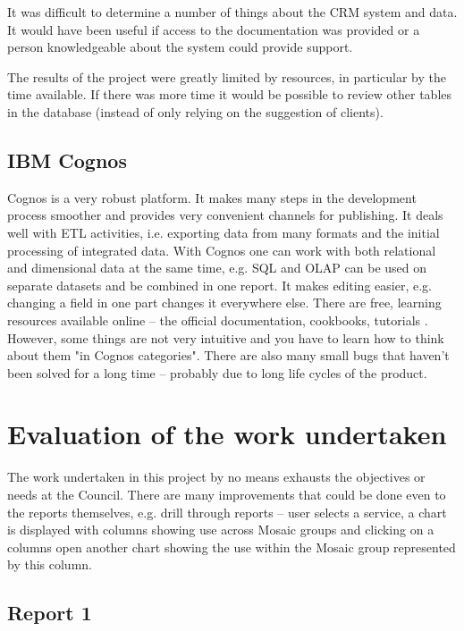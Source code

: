 It was difficult to determine a number of things about the CRM system and data. It would have been useful if access to the documentation was provided or a person knowledgeable about the system could provide support.

The results of the project were greatly limited by resources, in particular by the time available. If there was more time it would be possible to review other tables in the database (instead of only relying on the suggestion of clients).
		
		\subsection{IBM Cognos}

Cognos is a very robust platform. It makes many steps in the development process smoother and provides very convenient channels for publishing. It deals well with ETL activities, i.e. exporting data from many formats and the initial processing of integrated data. With Cognos one can work with both relational and dimensional data at the same time, e.g. SQL and OLAP can be used on separate datasets and be combined in one report. It makes editing easier, e.g. changing a field in one part changes it everywhere else. There are free, learning resources available online – the official documentation, cookbooks, tutorials \citep{MIT}. However, some things are not very intuitive and you have to learn how to think about them "in Cognos categories". There are also many small bugs that haven't been solved for a long time – probably due to long life cycles of the product.

	\section{Evaluation of the work undertaken}
	
The work undertaken in this project by no means exhausts the objectives or needs at the Council. There are many improvements that could be done even to the reports themselves, e.g. drill through reports – user selects a service, a chart is displayed with columns showing use across Mosaic groups and clicking on a columns open another chart showing the use within the Mosaic group represented by this column.

		\subsection{Report 1}
		
